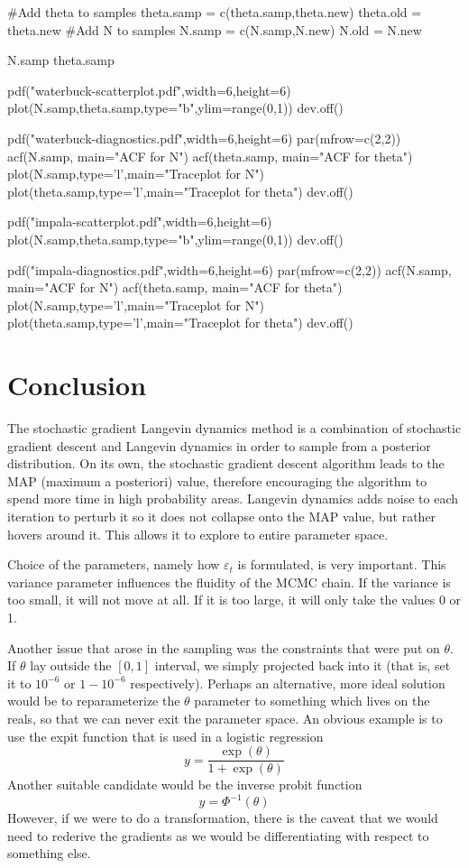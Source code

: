 \documentclass[letterpaper,12pt]{amsart}
\newenvironment{verbatimcode}{\bigskip \scriptsize \verbatim}{\endverbatim \normalsize \bigskip}
\begin{document}
\begin{enumerate}[1.]
\begin{verbatimcode}
{  #Add theta to samples
  theta.samp = c(theta.samp,theta.new)
  theta.old = theta.new
  #Add N to samples
  N.samp = c(N.samp,N.new)
  N.old = N.new
}

N.samp
theta.samp



pdf("waterbuck-scatterplot.pdf",width=6,height=6)
plot(N.samp,theta.samp,type="b",ylim=range(0,1))
dev.off()


pdf("waterbuck-diagnostics.pdf",width=6,height=6)
par(mfrow=c(2,2))
acf(N.samp, main="ACF for N")
acf(theta.samp, main="ACF for theta")
plot(N.samp,type='l',main="Traceplot for N")
plot(theta.samp,type='l',main="Traceplot for theta")
dev.off()


pdf("impala-scatterplot.pdf",width=6,height=6)
plot(N.samp,theta.samp,type="b",ylim=range(0,1))
dev.off()


pdf("impala-diagnostics.pdf",width=6,height=6)
par(mfrow=c(2,2))
acf(N.samp, main="ACF for N")
acf(theta.samp, main="ACF for theta")
plot(N.samp,type='l',main="Traceplot for N")
plot(theta.samp,type='l',main="Traceplot for theta")
dev.off()
\end{verbatimcode}

\end{enumerate}


\section{Conclusion}
The stochastic gradient Langevin dynamics method is a combination of stochastic gradient descent and Langevin dynamics in order to sample from a posterior distribution. On its own, the stochastic gradient descent algorithm leads to the MAP (maximum a posteriori) value, therefore encouraging the algorithm to spend more time in high probability areas. Langevin dynamics adds noise to each iteration to perturb it so it does not collapse onto the MAP value, but rather hovers around it. This allows it to explore to entire parameter space. 

Choice of the parameters, namely how $\varepsilon_t$ is formulated, is very important. This variance parameter influences the fluidity of the MCMC chain. If the variance is too small, it will not move at all. If it is too large, it will only take the values 0 or 1.

Another issue that arose in the sampling was the constraints that were put on $\theta$. If $\theta$ lay outside the $[0,1]$ interval, we simply projected back into it (that is, set it to $10^{-6}$ or $1-10^{-6}$ respectively). Perhaps an alternative, more ideal solution would be to reparameterize the $\theta$ parameter to something which lives on the reals, so that we can never exit the parameter space. An obvious example is to use the expit function that is used in a logistic regression
\[y = \frac{\exp(\theta)}{1 + \exp(\theta)}\]
Another suitable candidate would be the inverse probit function
\[y = \Phi^{-1}(\theta)\]
However, if we were to do a transformation, there is the caveat that we would need to rederive the gradients as we would be differentiating with respect to something else.
\end{document}
